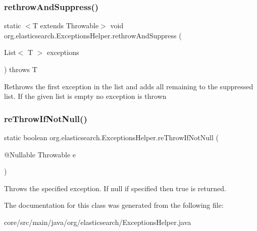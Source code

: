 \subsubsection{\texorpdfstring{rethrow\+And\+Suppress()}{rethrowAndSuppress()}}
{\footnotesize\ttfamily static $<$T extends Throwable$>$ void org.\+elasticsearch.\+Exceptions\+Helper.\+rethrow\+And\+Suppress (\begin{DoxyParamCaption}\item[{List$<$ T $>$}]{exceptions }\end{DoxyParamCaption}) throws T\hspace{0.3cm}{\ttfamily [static]}}

Rethrows the first exception in the list and adds all remaining to the suppressed list. If the given list is empty no exception is thrown \hypertarget{classorg_1_1elasticsearch_1_1_exceptions_helper_adfbdc4265cf1618e246644191df6997d}{}\label{classorg_1_1elasticsearch_1_1_exceptions_helper_adfbdc4265cf1618e246644191df6997d} 
\subsubsection{\texorpdfstring{re\+Throw\+If\+Not\+Null()}{reThrowIfNotNull()}}
{\footnotesize\ttfamily static boolean org.\+elasticsearch.\+Exceptions\+Helper.\+re\+Throw\+If\+Not\+Null (\begin{DoxyParamCaption}\item[{@Nullable Throwable}]{e }\end{DoxyParamCaption})\hspace{0.3cm}{\ttfamily [static]}}

Throws the specified exception. If null if specified then {\ttfamily true} is returned. 

The documentation for this class was generated from the following file\+:\begin{DoxyCompactItemize}
\item 
core/src/main/java/org/elasticsearch/Exceptions\+Helper.\+java\end{DoxyCompactItemize}
